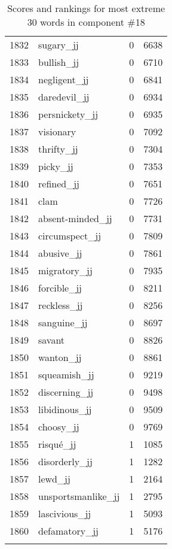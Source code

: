 \begin{longtable}[!htbp]{| rlr@{.}l |}
    1832 & sugary\_jj & 0 & 6638 \\
    1833 & bullish\_jj & 0 & 6710 \\
    1834 & negligent\_jj & 0 & 6841 \\
    1835 & daredevil\_jj & 0 & 6934 \\
    1836 & persnickety\_jj & 0 & 6935 \\
    1837 & visionary & 0 & 7092 \\
    1838 & thrifty\_jj & 0 & 7304 \\
    1839 & picky\_jj & 0 & 7353 \\
    1840 & refined\_jj & 0 & 7651 \\
    1841 & clam & 0 & 7726 \\
    1842 & absent-minded\_jj & 0 & 7731 \\
    1843 & circumspect\_jj & 0 & 7809 \\
    1844 & abusive\_jj & 0 & 7861 \\
    1845 & migratory\_jj & 0 & 7935 \\
    1846 & forcible\_jj & 0 & 8211 \\
    1847 & reckless\_jj & 0 & 8256 \\
    1848 & sanguine\_jj & 0 & 8697 \\
    1849 & savant & 0 & 8826 \\
    1850 & wanton\_jj & 0 & 8861 \\
    1851 & squeamish\_jj & 0 & 9219 \\
    1852 & discerning\_jj & 0 & 9498 \\
    1853 & libidinous\_jj & 0 & 9509 \\
    1854 & choosy\_jj & 0 & 9769 \\
    1855 & risqué\_jj & 1 & 1085 \\
    1856 & disorderly\_jj & 1 & 1282 \\
    1857 & lewd\_jj & 1 & 2164 \\
    1858 & unsportsmanlike\_jj & 1 & 2795 \\
    1859 & lascivious\_jj & 1 & 5093 \\
    1860 & defamatory\_jj & 1 & 5176 \\
    \hline
    \caption{Scores and rankings for most extreme 30 words in component \#18} \\
\end{longtable}
